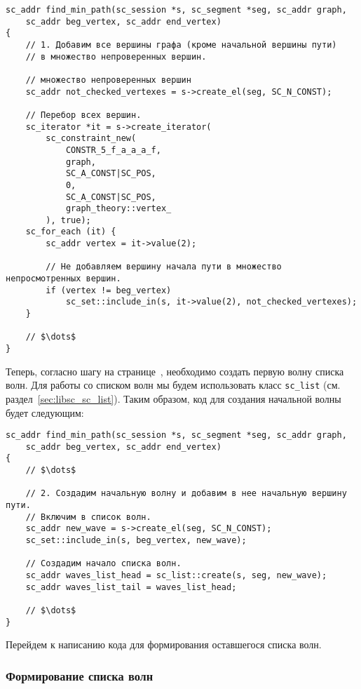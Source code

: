 \begin{lstlisting}[texcl]
sc_addr find_min_path(sc_session *s, sc_segment *seg, sc_addr graph,
    sc_addr beg_vertex, sc_addr end_vertex)
{
    // 1. Добавим все вершины графа (кроме начальной вершины пути)
    // в множество непроверенных вершин.

    // множество непроверенных вершин
    sc_addr not_checked_vertexes = s->create_el(seg, SC_N_CONST);

    // Перебор всех вершин.
    sc_iterator *it = s->create_iterator(
        sc_constraint_new(
            CONSTR_5_f_a_a_a_f,
            graph,
            SC_A_CONST|SC_POS,
            0,
            SC_A_CONST|SC_POS,
            graph_theory::vertex_
        ), true);
    sc_for_each (it) {
        sc_addr vertex = it->value(2);

        // Не добавляем вершину начала пути в множество непросмотренных вершин.
        if (vertex != beg_vertex)
            sc_set::include_in(s, it->value(2), not_checked_vertexes);
    }

    // $\dots$
}
\end{lstlisting}

Теперь, согласно шагу на странице~\pageref{astep:S3_Create_1st_wave},
необходимо создать первую волну списка волн. Для работы со списком
волн мы будем использовать класс \lstinline|sc_list|
(см. раздел~\ref{sec:libsc_sc_list}). Таким образом, код для создания
начальной волны будет следующим:

\begin{lstlisting}[texcl]
sc_addr find_min_path(sc_session *s, sc_segment *seg, sc_addr graph,
    sc_addr beg_vertex, sc_addr end_vertex)
{
    // $\dots$

    // 2. Создадим начальную волну и добавим в нее начальную вершину пути.
    // Включим в список волн.
    sc_addr new_wave = s->create_el(seg, SC_N_CONST);
    sc_set::include_in(s, beg_vertex, new_wave);

    // Создадим начало списка волн.
    sc_addr waves_list_head = sc_list::create(s, seg, new_wave);
    sc_addr waves_list_tail = waves_list_head;

    // $\dots$
}
\end{lstlisting}

Перейдем к написанию кода для формирования оставшегося списка волн.

\subsubsection{Формирование списка волн}
\label{sec:libscprg_fmp_waves_list}

